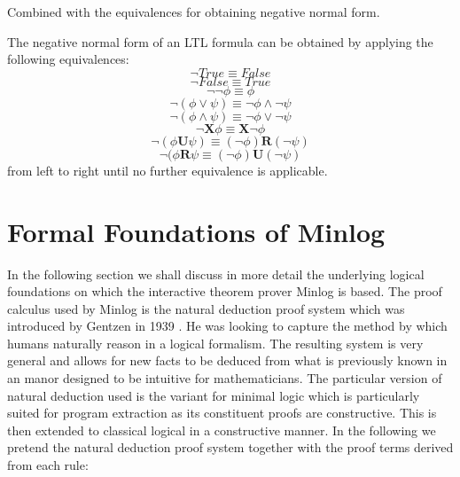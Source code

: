Combined  with the equivalences for obtaining negative normal form.

\begin{mydef}
The negative normal form of an LTL formula can be obtained by applying the following equivalences:
$$\neg True \equiv False$$
$$\neg False \equiv True$$
$$\neg \neg \phi \equiv \phi$$
$$\neg (\phi \vee \psi) \equiv \neg \phi \wedge \neg \psi $$
$$\neg (\phi \wedge \psi) \equiv \neg \phi \vee \neg \psi$$
$$\neg \mathbf{X} \phi \equiv \mathbf{X} \neg \phi$$
$$\neg (\phi \mathbf{U} \psi) \equiv (\neg \phi) \mathbf{R} (\neg \psi)$$
$$\neg (\phi \mathbf{R} \psi \equiv (\neg \phi) \mathbf{U} (\neg \psi)$$
from left to right until no further equivalence is applicable.
\end{mydef}


\section{Formal Foundations of Minlog}
In the following section we shall discuss in more detail the underlying logical foundations on which the interactive theorem prover Minlog is based. The proof calculus used by Minlog is the natural deduction proof system which was introduced by Gentzen in 1939 \cite{GG69}. He was looking to capture the method by which humans naturally reason in a logical formalism.  The resulting system is very general and allows for new facts to be deduced from what is previously known in an manor designed to be intuitive for mathematicians.  The particular version of natural deduction used is the variant for minimal logic which is particularly suited for program extraction as its constituent proofs are constructive. This is then extended to classical logical in a constructive manner. In the following we pretend the natural deduction proof system together with the proof terms derived from each rule:

\medskip

